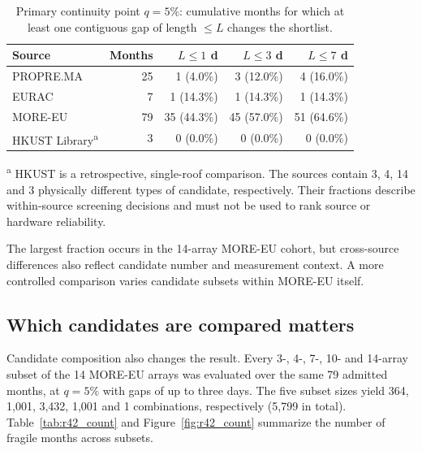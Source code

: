 \documentclass[preprint,12pt]{elsarticle}
\begin{document}
\begin{table}[htbp]
\centering
\caption{Primary continuity point $q=5\%$: cumulative months for which at least one contiguous gap of length $\leq L$ changes the shortlist.}
\label{tab:q5}
\footnotesize
\begin{tabular}{lrrrr}
\toprule
Source & Months & $L\leq1$ d & $L\leq3$ d & $L\leq7$ d \\
\midrule
PROPRE.MA & 25 & 1 (4.0\%) & 3 (12.0\%) & 4 (16.0\%) \\
EURAC & 7 & 1 (14.3\%) & 1 (14.3\%) & 1 (14.3\%) \\
MORE-EU & 79 & 35 (44.3\%) & 45 (57.0\%) & 51 (64.6\%) \\
HKUST Library\textsuperscript{a} & 3 & 0 (0.0\%) & 0 (0.0\%) & 0 (0.0\%) \\
\bottomrule
\end{tabular}
\begin{flushleft}\footnotesize\textsuperscript{a} HKUST is a retrospective, single-roof comparison. The sources contain 3, 4, 14 and 3 physically different types of candidate, respectively. Their fractions describe within-source screening decisions and must not be used to rank source or hardware reliability.\end{flushleft}
\end{table}

The largest fraction occurs in the 14-array MORE-EU cohort, but cross-source differences also reflect candidate number and measurement context. A more controlled comparison varies candidate subsets within MORE-EU itself.

\subsection{Which candidates are compared matters}
Candidate composition also changes the result. Every 3-, 4-, 7-, 10- and 14-array subset of the 14 MORE-EU arrays was evaluated over the same 79 admitted months, at $q=5\%$ with gaps of up to three days. The five subset sizes yield 364, 1,001, 3,432, 1,001 and 1 combinations, respectively (5,799 in total). Table~\ref{tab:r42_count} and Figure~\ref{fig:r42_count} summarize the number of fragile months across subsets.
\end{document}
